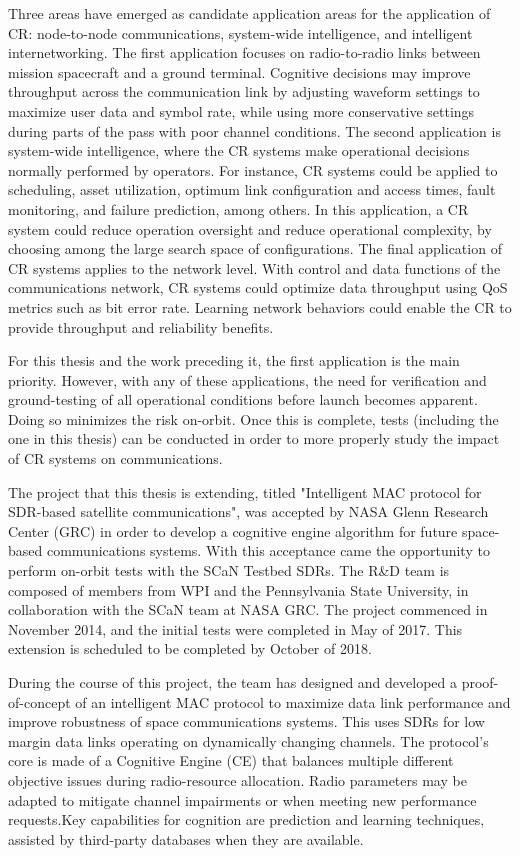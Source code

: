 	\par Three areas have emerged as candidate application areas for the application of CR: node-to-node communications, system-wide intelligence, and intelligent internetworking. The first application focuses on radio-to-radio links between mission spacecraft and a ground terminal. Cognitive decisions may improve throughput across the communication link by adjusting waveform settings to maximize user data and symbol rate, while using more conservative settings during parts of the pass with poor channel conditions. The second application is system-wide intelligence, where the CR systems make operational decisions normally performed by operators. For instance, CR systems could be applied to scheduling, asset utilization, optimum link configuration and access times, fault monitoring, and failure prediction, among others. In this application, a CR system could reduce operation oversight and reduce operational complexity, by choosing among the large search space of configurations. The final application of CR systems applies to the network level. With control and data functions of the communications network, CR systems could optimize data throughput using QoS metrics such as bit error rate. Learning network behaviors could enable the CR to provide throughput and reliability benefits.
	\par  For this thesis and the work preceding it, the first application is the main priority. However, with any of these applications, the need for verification and ground-testing of all operational conditions before launch becomes apparent. Doing so minimizes the risk on-orbit. Once this is complete, tests (including the one in this thesis) can be conducted in order to more properly study the impact of CR systems on communications.
	\par The project that this thesis is extending, titled "Intelligent MAC protocol for SDR-based satellite communications", was accepted by NASA Glenn Research Center (GRC) in order to develop a cognitive engine algorithm for future space-based communications systems. With this acceptance came the opportunity to perform on-orbit tests with the SCaN Testbed SDRs. The R\&D team is composed of members from WPI and the Pennsylvania State University, in collaboration with the SCaN team at NASA GRC. The project commenced in November 2014, and the initial tests were completed in May of 2017. This extension is scheduled to be completed by October of 2018.
	\par During the course of this project, the team has designed and developed a proof-of-concept of an intelligent MAC protocol to maximize data link performance and improve robustness of space communications systems. This uses SDRs for low margin data links operating on dynamically changing channels. The protocol's core is made of a Cognitive Engine (CE) that balances multiple different objective issues during radio-resource allocation. Radio parameters may be adapted to mitigate channel impairments or when meeting new performance requests.Key capabilities for cognition are prediction and learning techniques, assisted by third-party databases when they are available.  
